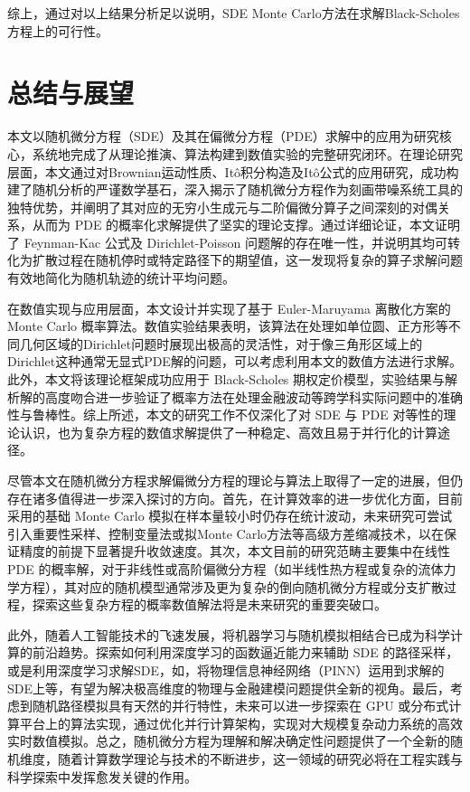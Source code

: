 \documentclass[oneside]{sysuthesis}
\begin{document}
综上，通过对以上结果分析足以说明，SDE Monte Carlo方法在求解Black-Scholes方程上的可行性。

\chapter{总结与展望}

本文以随机微分方程（SDE）及其在偏微分方程（PDE）求解中的应用为研究核心，系统地完成了从理论推演、算法构建到数值实验的完整研究闭环。在理论研究层面，本文通过对Brownian运动性质、It\^o积分构造及It\^o公式的应用研究，成功构建了随机分析的严谨数学基石，深入揭示了随机微分方程作为刻画带噪系统工具的独特优势，并阐明了其对应的无穷小生成元与二阶偏微分算子之间深刻的对偶关系，从而为 PDE 的概率化求解提供了坚实的理论支撑。通过详细论证，本文证明了 Feynman-Kac 公式及 Dirichlet-Poisson 问题解的存在唯一性，并说明其均可转化为扩散过程在随机停时或特定路径下的期望值，这一发现将复杂的算子求解问题有效地简化为随机轨迹的统计平均问题。

在数值实现与应用层面，本文设计并实现了基于 Euler-Maruyama 离散化方案的 Monte Carlo 概率算法。数值实验结果表明，该算法在处理如单位圆、正方形等不同几何区域的Dirichlet问题时展现出极高的灵活性，对于像三角形区域上的Dirichlet这种通常无显式PDE解的问题，可以考虑利用本文的数值方法进行求解。此外，本文将该理论框架成功应用于 Black-Scholes 期权定价模型，实验结果与解析解的高度吻合进一步验证了概率方法在处理金融波动等跨学科实际问题中的准确性与鲁棒性。综上所述，本文的研究工作不仅深化了对 SDE 与 PDE 对等性的理论认识，也为复杂方程的数值求解提供了一种稳定、高效且易于并行化的计算途径。

尽管本文在随机微分方程求解偏微分方程的理论与算法上取得了一定的进展，但仍存在诸多值得进一步深入探讨的方向。首先，在计算效率的进一步优化方面，目前采用的基础 Monte Carlo 模拟在样本量较小时仍存在统计波动，未来研究可尝试引入重要性采样、控制变量法或拟Monte Carlo方法等高级方差缩减技术，以在保证精度的前提下显著提升收敛速度。其次，本文目前的研究范畴主要集中在线性 PDE 的概率解，对于非线性或高阶偏微分方程（如半线性热方程或复杂的流体力学方程），其对应的随机模型通常涉及更为复杂的倒向随机微分方程或分支扩散过程，探索这些复杂方程的概率数值解法将是未来研究的重要突破口。

此外，随着人工智能技术的飞速发展，将机器学习与随机模拟相结合已成为科学计算的前沿趋势。探索如何利用深度学习的函数逼近能力来辅助 SDE 的路径采样，或是利用深度学习求解SDE，如，将物理信息神经网络（PINN）运用到求解的SDE上等，有望为解决极高维度的物理与金融建模问题提供全新的视角。最后，考虑到随机路径模拟具有天然的并行特性，未来可以进一步探索在 GPU 或分布式计算平台上的算法实现，通过优化并行计算架构，实现对大规模复杂动力系统的高效实时数值模拟。总之，随机微分方程为理解和解决确定性问题提供了一个全新的随机维度，随着计算数学理论与技术的不断进步，这一领域的研究必将在工程实践与科学探索中发挥愈发关键的作用。
\end{document}
